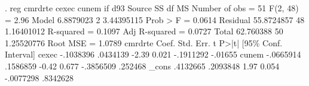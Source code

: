 . reg cmrdrte cexec cunem if d93
{\smallskip}
      Source {\VBAR}       SS           df       MS      Number of obs   =        51
   F(2, 48)        =      2.96
       Model {\VBAR}   6.8879023         2  3.44395115   Prob > F        =    0.0614
    Residual {\VBAR}  55.8724857        48  1.16401012   R-squared       =    0.1097
   Adj R-squared   =    0.0727
       Total {\VBAR}   62.760388        50  1.25520776   Root MSE        =    1.0789
{\smallskip}
     cmrdrte {\VBAR}      Coef.   Std. Err.      t    P>|t|     [95\% Conf. Interval]
       cexec {\VBAR}  -.1038396   .0434139    -2.39   0.021    -.1911292     -.01655
       cunem {\VBAR}  -.0665914   .1586859    -0.42   0.677    -.3856509     .252468
       _cons {\VBAR}   .4132665   .2093848     1.97   0.054    -.0077298    .8342628
{\smallskip}
